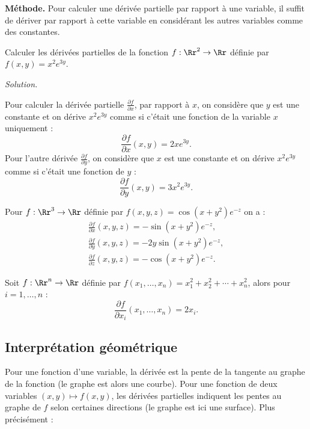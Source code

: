 \documentclass[11pt,class=report,crop=false]{standalone}
\begin{document}
\textbf{Méthode.}
Pour calculer une dérivée partielle par rapport à une variable, il suffit de dériver par rapport à cette variable en considérant les autres variables comme des constantes.


\begin{exemple}
Calculer les dérivées partielles de la fonction 
$f : \Rr^2 \to \Rr$ définie par $f(x,y)=x^2e^{3y}$.

\medskip
\emph{Solution.}

Pour calculer la dérivée partielle $\frac{\partial f}{\partial x}$, par rapport à $x$, on considère que $y$ est une constante et on dérive $x^2e ^{3y}$ comme si c'était une fonction de la variable $x$ uniquement :
$$\frac{\partial f}{\partial x}(x,y) =2xe ^{3y}.$$
Pour l'autre dérivée  $\frac{\partial f}{\partial y}$, on considère que $x$ est une constante et on dérive $x^2e ^{3y}$ comme si c'était une fonction de $y$ :
$$\frac{\partial f}{\partial y}(x,y) = 3x^2e ^{3y}.$$
\end{exemple}



\begin{exemple}
Pour $f : \Rr^3 \to \Rr$ définie par $f(x,y,z)=\cos (x+y^2)e^{-z}$ on a :
\begin{align*}
\frac{\partial f}{\partial x}(x,y,z) = -\sin(x+y^2)e^{-z}, \\
\frac{\partial f}{\partial y}(x,y,z) = -2y\sin(x+y^2)e^{-z}, \\
\frac{\partial f}{\partial z}(x,y,z) = -\cos(x+y^2)e^{-z}.
\end{align*}
\end{exemple}


\begin{exemple}
Soit $f :\Rr^n \to \Rr$ définie par 
$f(x_1,\ldots,x_n) = x_1^2+x_2^2+\cdots + x_n^2$,
alors pour $i=1,\ldots,n$ :
$$\frac{\partial f}{\partial x_i}(x_1,\ldots,x_n) = 2x_i.$$
\end{exemple}


\subsection{Interprétation géométrique}


Pour une fonction d'une variable, la dérivée est la pente de la tangente au graphe de la fonction (le graphe est alors une courbe). Pour une fonction de deux variables $(x,y) \mapsto f(x,y)$, les dérivées partielles indiquent les pentes au graphe de $f$ selon certaines directions (le graphe est ici une surface). Plus précisément :
\end{document}
